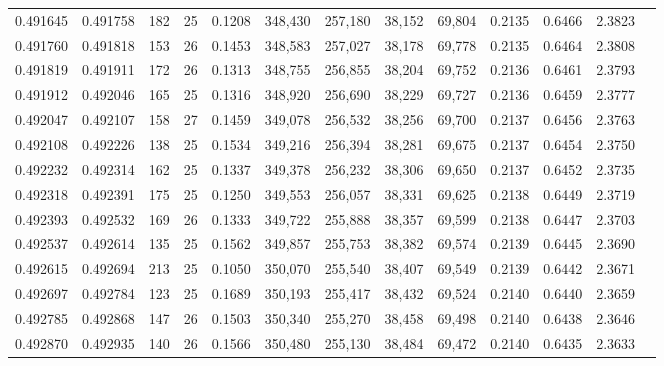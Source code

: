 \begin{tabular}{rrrrrrrrrrrrr}
0.491645 & 0.491758 & 182 &  25 &                                     0.1208 & 348,430 & 257,180 &  38,152 &  69,804 & 0.2135 & 0.6466 & 2.3823 \\
0.491760 & 0.491818 & 153 &  26 &                                     0.1453 & 348,583 & 257,027 &  38,178 &  69,778 & 0.2135 & 0.6464 & 2.3808 \\
0.491819 & 0.491911 & 172 &  26 &                                     0.1313 & 348,755 & 256,855 &  38,204 &  69,752 & 0.2136 & 0.6461 & 2.3793 \\
0.491912 & 0.492046 & 165 &  25 &                                     0.1316 & 348,920 & 256,690 &  38,229 &  69,727 & 0.2136 & 0.6459 & 2.3777 \\
0.492047 & 0.492107 & 158 &  27 &                                     0.1459 & 349,078 & 256,532 &  38,256 &  69,700 & 0.2137 & 0.6456 & 2.3763 \\
0.492108 & 0.492226 & 138 &  25 &                                     0.1534 & 349,216 & 256,394 &  38,281 &  69,675 & 0.2137 & 0.6454 & 2.3750 \\
0.492232 & 0.492314 & 162 &  25 &                                     0.1337 & 349,378 & 256,232 &  38,306 &  69,650 & 0.2137 & 0.6452 & 2.3735 \\
0.492318 & 0.492391 & 175 &  25 &                                     0.1250 & 349,553 & 256,057 &  38,331 &  69,625 & 0.2138 & 0.6449 & 2.3719 \\
0.492393 & 0.492532 & 169 &  26 &                                     0.1333 & 349,722 & 255,888 &  38,357 &  69,599 & 0.2138 & 0.6447 & 2.3703 \\
0.492537 & 0.492614 & 135 &  25 &                                     0.1562 & 349,857 & 255,753 &  38,382 &  69,574 & 0.2139 & 0.6445 & 2.3690 \\
0.492615 & 0.492694 & 213 &  25 &                                     0.1050 & 350,070 & 255,540 &  38,407 &  69,549 & 0.2139 & 0.6442 & 2.3671 \\
0.492697 & 0.492784 & 123 &  25 &                                     0.1689 & 350,193 & 255,417 &  38,432 &  69,524 & 0.2140 & 0.6440 & 2.3659 \\
0.492785 & 0.492868 & 147 &  26 &                                     0.1503 & 350,340 & 255,270 &  38,458 &  69,498 & 0.2140 & 0.6438 & 2.3646 \\
0.492870 & 0.492935 & 140 &  26 &                                     0.1566 & 350,480 & 255,130 &  38,484 &  69,472 & 0.2140 & 0.6435 & 2.3633 \\

\end{tabular}
